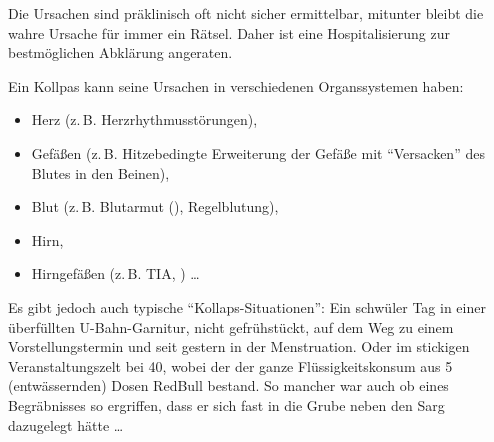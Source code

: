 {
Die Ursachen sind präklinisch oft
nicht sicher ermittelbar, mitunter bleibt die wahre Ursache
für immer ein Rätsel. Daher ist eine Hospitalisierung zur
bestmöglichen Abklärung angeraten. 

Ein Kollpas kann seine Ursachen in verschiedenen Organssystemen haben:

\begin{itemize}
  \item Herz (z.\,B. Herzrhythmusstörungen),
  \item Gefäßen (z.\,B. Hitzebedingte Erweiterung
  der Gefäße mit "`Versacken"' des Blutes in den Beinen),
  \item Blut (z.\,B. Blutarmut (),
  Regelblutung),
  \item Hirn,
  \item Hirngefäßen (z.\,B. TIA,
   ) \ldots
\end{itemize}

Es gibt jedoch auch typische "`Kollaps-Situationen"': Ein
schwüler Tag in einer überfüllten U-Bahn-Garnitur, nicht
gefrühstückt, auf dem Weg zu einem Vorstellungstermin und
seit gestern in der Menstruation. Oder im stickigen
Veranstaltungszelt bei 40\textdegree , wobei der der ganze
Flüssigkeitskonsum aus 5 (entwässernden) Dosen
RedBull\texttrademark
bestand. So mancher war auch ob eines Begräbnisses so
ergriffen, dass er sich fast in die Grube neben den Sarg
dazugelegt hätte \ldots 

}{

}{}{}{}



